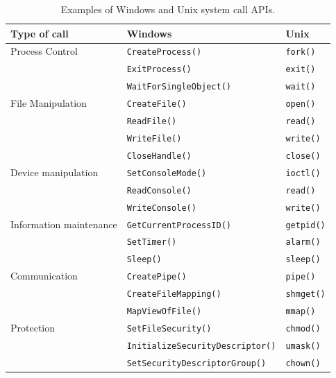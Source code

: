 \begin{table}[htp]
  \centering
  \caption*{Examples of Windows and Unix system call APIs.}
  \begin{tabular}{lll}
    \toprule
    Type of call & Windows & Unix \\
    \midrule
    Process Control & \texttt{CreateProcess()}       & \texttt{fork()} \\
                    & \texttt{ExitProcess()}         & \texttt{exit()} \\
                    & \texttt{WaitForSingleObject()} & \texttt{wait()} \\
    File Manipulation & \texttt{CreateFile()}  & \texttt{open()}  \\
                      & \texttt{ReadFile()}    & \texttt{read()}  \\
                      & \texttt{WriteFile()}   & \texttt{write()} \\
                      & \texttt{CloseHandle()} & \texttt{close()} \\
    Device manipulation & \texttt{SetConsoleMode()} & \texttt{ioctl()} \\
                        & \texttt{ReadConsole()}    & \texttt{read()}  \\
                        & \texttt{WriteConsole()}   & \texttt{write()} \\
    Information maintenance & \texttt{GetCurrentProcessID()} & \texttt{getpid()} \\
                            & \texttt{SetTimer()}            & \texttt{alarm()}  \\
                            & \texttt{Sleep()}               & \texttt{sleep()}  \\
    Communication & \texttt{CreatePipe()}        & \texttt{pipe()}   \\
                  & \texttt{CreateFileMapping()} & \texttt{shmget()} \\
                  & \texttt{MapViewOfFile()}     & \texttt{mmap()}   \\
    Protection & \texttt{SetFileSecurity()}              & \texttt{chmod()} \\
               & \texttt{InitializeSecurityDescriptor()} & \texttt{umask()} \\
               & \texttt{SetSecurityDescriptorGroup()}   & \texttt{chown()} \\
    \bottomrule
  \end{tabular}
\end{table}

